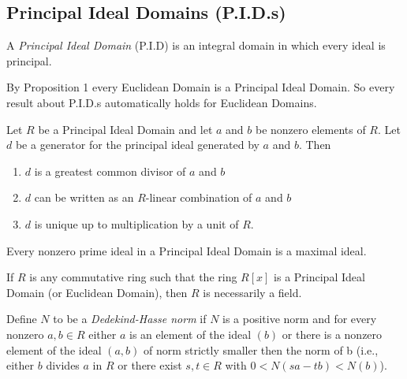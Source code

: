 \documentclass[../main]{subfiles}
\begin{document}
\addtocounter{thm}{1}


\subsection{Principal Ideal Domains (P.I.D.s)}


\begin{dfn}
 A \textit{Principal Ideal Domain} (P.I.D) is an integral domain in which every ideal is principal.
\end{dfn}


\begin{nt}
 By Proposition 1 every Euclidean Domain is a Principal Ideal Domain. So every result about P.I.D.s automatically holds for Euclidean Domains.
\end{nt}


\begin{prop}
 Let $R$ be a Principal Ideal Domain and let $a$ and $b$ be nonzero elements of $R$. Let $d$ be a generator for the principal ideal generated by $a$ and $b$. Then 
 \begin{enumerate}
  \item $d$ is a greatest common divisor of $a$ and $b$
  
  \item $d$ can be written as an $R$-linear combination of $a$ and $b$
  
  \item $d$ is unique up to multiplication by a unit of $R$.
 \end{enumerate}
\end{prop}


\begin{prop}
 Every nonzero prime ideal in a Principal Ideal Domain is a maximal ideal.
\end{prop}


\begin{cor}
 If $R$ is any commutative ring such that the ring $R[x]$ is a Principal Ideal Domain (or Euclidean Domain), then $R$ is necessarily a field. 
\end{cor}


\begin{dfn}
 Define $N$ to be a \textit{Dedekind-Hasse norm} if $N$ is a positive norm and for every nonzero $a,b \in R$ either $a$ is an element of the ideal $(b)$ or there is a nonzero element of the ideal $(a,b)$ of norm strictly smaller then the norm of b (i.e., either $b$ divides $a$ in $R$ or there exist $s,t \in R$ with $0 < N(sa - tb) < N(b)$).
\end{dfn}
\end{document}
